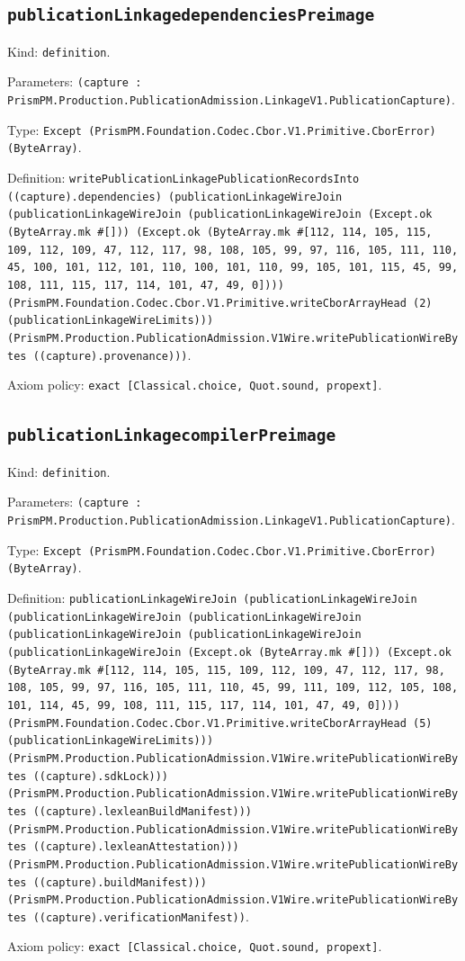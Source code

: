 \documentclass[11pt]{article}
\begin{document}
\subsection*{\texttt{publicationLinkagedependenciesPreimage}}
\noindent Kind: \texttt{definition}.\par
\noindent Parameters: \texttt{(capture : PrismPM.Production.PublicationAdmission.LinkageV1.PublicationCapture)}.\par
\noindent Type: \texttt{Except (PrismPM.Foundation.Codec.Cbor.V1.Primitive.CborError) (ByteArray)}.\par
\noindent Definition: \texttt{writePublicationLinkagePublicationRecordsInto ((capture).dependencies) (publicationLinkageWireJoin (publicationLinkageWireJoin (publicationLinkageWireJoin (Except.ok (ByteArray.mk \#[])) (Except.ok (ByteArray.mk \#[112, 114, 105, 115, 109, 112, 109, 47, 112, 117, 98, 108, 105, 99, 97, 116, 105, 111, 110, 45, 100, 101, 112, 101, 110, 100, 101, 110, 99, 105, 101, 115, 45, 99, 108, 111, 115, 117, 114, 101, 47, 49, 0]))) (PrismPM.Foundation.Codec.Cbor.V1.Primitive.writeCborArrayHead (2) (publicationLinkageWireLimits))) (PrismPM.Production.PublicationAdmission.V1Wire.writePublicationWireBytes ((capture).provenance)))}.\par
\noindent Axiom policy: \texttt{exact [Classical.choice, Quot.sound, propext]}.\par
\subsection*{\texttt{publicationLinkagecompilerPreimage}}
\noindent Kind: \texttt{definition}.\par
\noindent Parameters: \texttt{(capture : PrismPM.Production.PublicationAdmission.LinkageV1.PublicationCapture)}.\par
\noindent Type: \texttt{Except (PrismPM.Foundation.Codec.Cbor.V1.Primitive.CborError) (ByteArray)}.\par
\noindent Definition: \texttt{publicationLinkageWireJoin (publicationLinkageWireJoin (publicationLinkageWireJoin (publicationLinkageWireJoin (publicationLinkageWireJoin (publicationLinkageWireJoin (publicationLinkageWireJoin (Except.ok (ByteArray.mk \#[])) (Except.ok (ByteArray.mk \#[112, 114, 105, 115, 109, 112, 109, 47, 112, 117, 98, 108, 105, 99, 97, 116, 105, 111, 110, 45, 99, 111, 109, 112, 105, 108, 101, 114, 45, 99, 108, 111, 115, 117, 114, 101, 47, 49, 0]))) (PrismPM.Foundation.Codec.Cbor.V1.Primitive.writeCborArrayHead (5) (publicationLinkageWireLimits))) (PrismPM.Production.PublicationAdmission.V1Wire.writePublicationWireBytes ((capture).sdkLock))) (PrismPM.Production.PublicationAdmission.V1Wire.writePublicationWireBytes ((capture).lexleanBuildManifest))) (PrismPM.Production.PublicationAdmission.V1Wire.writePublicationWireBytes ((capture).lexleanAttestation))) (PrismPM.Production.PublicationAdmission.V1Wire.writePublicationWireBytes ((capture).buildManifest))) (PrismPM.Production.PublicationAdmission.V1Wire.writePublicationWireBytes ((capture).verificationManifest))}.\par
\noindent Axiom policy: \texttt{exact [Classical.choice, Quot.sound, propext]}.\par
\end{document}

